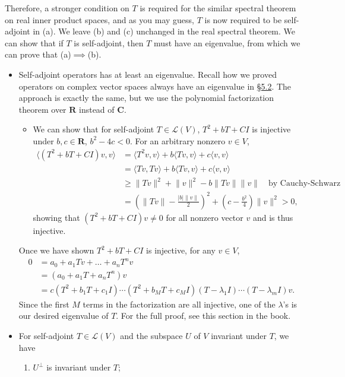 \documentclass[11pt]{article}
\newcommand{\lk}[2]{\hyperlink{subsection.#1.#2}{\S#1.#2}}
\newcommand{\R}{\mathbf{R}}
\newcommand{\C}{\mathbf{C}}
\newcommand{\inp}[2]{\langle #1, #2 \rangle}
\newcommand{\nm}[1]{\lVert #1 \rVert}
\newcommand{\abs}[1]{\lvert #1 \rvert}
\newcommand{\LV}{\mathcal{L}(V)}
\begin{document}
Therefore, a stronger condition on $T$ is required for the similar spectral theorem on real inner product spaces, and as you may guess, $T$ is now required to be self-adjoint in (a). We leave (b) and (c) unchanged in the real spectral theorem. We can show that if $T$ is self-adjoint, then $T$ must have an eigenvalue, from which we can prove that (a)$\implies$(b).
    \begin{itemize}
    \item Self-adjoint operators has at least an eigenvalue. Recall how we proved operators on complex vector spaces always have an eigenvalue in \lk{5}{2}. The approach is exactly the same, but we use the polynomial factorization theorem over $\R$ instead of $\C$.
    \begin{itemize}
        \item We can show that for self-adjoint $T \in \LV$, $T^2+bT+CI$ is injective under $b,c\in\R$, $b^2-4c<0$. For an arbitrary nonzero $v \in V$,
        \begin{align*}
            \inp{(T^2+bT+CI)v}{v} & = \inp{T^2v}{v}+b\inp{Tv}{v}+c\inp{v}{v} \\
            & = \inp{Tv}{Tv}+b\inp{Tv}{v}+c\inp{v}{v} \\
            & \geq \nm{Tv}^2+\nm{v}^2 -b\nm{Tv}\nm{v} \quad \text{by Cauchy-Schwarz}\\
            & = \left(\nm{Tv}-\frac{\abs{b}\nm{v}}{2}\right)^2 + \left(c - \frac{b^2}{4}\right)\nm{v}^2 > 0,
        \end{align*}
        showing that $(T^2+bT+CI)v \not= 0$ for all nonzero vector $v$ and is thus injective.
    \end{itemize}
    
    Once we have shown $T^2+bT+CI$ is injective, for any $v \in V$,
    \begin{align*}
        0 & = a_0+a_1Tv+\dots+a_nT^nv \\
        & = (a_0+a_1T+a_nT^n) v \\
        & = c(T^2+b_1T+c_1I)\cdots(T^2+b_MT+c_MI)(T-\lambda_1I)\cdots(T-\lambda_mI)v.
    \end{align*}
    Since the first $M$ terms in the factorization are all injective, one of the $\lambda$'s is our desired eigenvalue of $T$. For the full proof, see this section in the book.
    \item For self-adjoint $T \in \LV$ and the subspace $U$ of $V$ invariant under $T$, we have
    \begin{enumerate}[label=(\alph*)]
        \item $U^\perp$ is invariant under $T$;
        

\end{enumerate}
\end{itemize}
\end{document}
